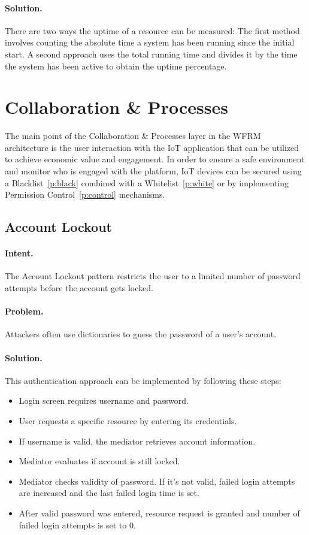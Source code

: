 \paragraph{\textbf{Solution.}} There are two ways the uptime of a resource can be measured: The first method involves counting the absolute time a system has been running since the initial start. A second approach uses the total running time and divides it by the time the system has been active to obtain the uptime percentage.



\section{Collaboration \& Processes}\label{L7} 
The main point of the Collaboration \& Processes layer in the WFRM architecture is the user interaction with the IoT application that can be utilized to achieve economic value and engagement. In order to ensure a safe environment and monitor who is engaged with the platform, IoT devices can be secured using a Blacklist~\ref{p:black} combined with a Whitelist~\ref{p:white} or by implementing Permission Control~\ref{p:control} mechanisms. 


\subsection{Account Lockout~\cite{Papoutsakis2021}} 
\label{p:lockout}

\paragraph{\textbf{Intent.}} The Account Lockout pattern restricts the user to a limited number of password attempts before the account gets locked. 

\paragraph{\textbf{Problem.}} Attackers often use dictionaries to guess the password of a user's account.

\paragraph{\textbf{Solution.}} This authentication approach can be implemented by following these steps:
\begin{itemize}
	\item Login screen requires username and password.
	\item User requests a specific resource by entering its credentials.
	\item If username is valid, the mediator retrieves account information.
	\item Mediator evaluates if account is still locked.
	\item Mediator checks validity of password. If it's not valid, failed login attempts are increased and the last failed login time is set.
	\item After valid password was entered, resource request is granted and number of failed login attempts is set to 0.
\end{itemize}


